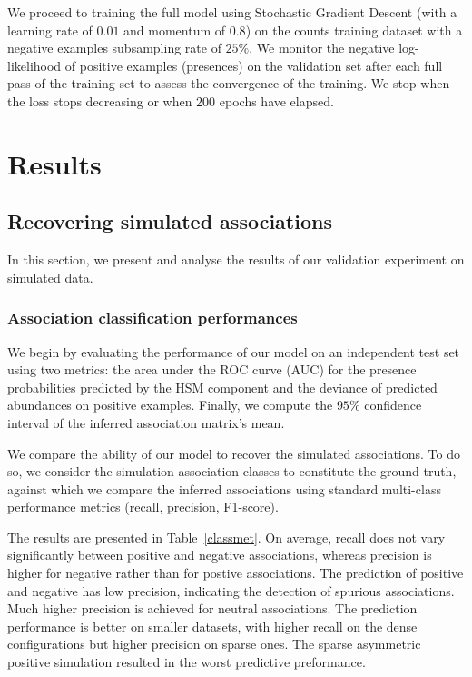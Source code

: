 \documentclass[10pt,a4paper]{article}
\begin{document}
We proceed to training the full model using Stochastic Gradient Descent (with a learning rate of $0.01$ and momentum of $0.8$) on the counts training dataset with a negative examples subsampling rate of $25\%$. We monitor the negative log-likelihood of positive examples (presences) on the validation set after each full pass of the training set to assess the convergence of the training. We stop when the loss stops decreasing or when $200$ epochs have elapsed.



\section{Results}

\subsection{Recovering simulated associations}
In this section, we present and analyse the results of our validation experiment on simulated data.

\subsubsection{Association classification performances}

We begin by evaluating the performance of our model on an independent test set using two metrics: the area under the ROC curve (AUC) for the presence probabilities predicted by the HSM component and the deviance of predicted abundances on positive examples. Finally, we compute the $95\%$ confidence interval of the inferred association matrix's mean.

We compare the ability of our model to recover the simulated associations. To do so, we consider the simulation association classes to constitute the ground-truth, against which we compare the inferred associations using standard multi-class performance metrics (recall, precision, F1-score).   

The results are presented in Table~\ref{classmet}.
On average, recall does not vary significantly between positive and negative associations, whereas precision is higher for negative rather than for postive associations. The prediction of positive and negative has low precision, indicating the detection of spurious associations. Much higher precision is achieved for neutral associations. The prediction performance is better on smaller datasets, with higher recall on the dense configurations but higher precision on sparse ones.
The sparse asymmetric positive simulation resulted in the worst predictive preformance.
\end{document}
